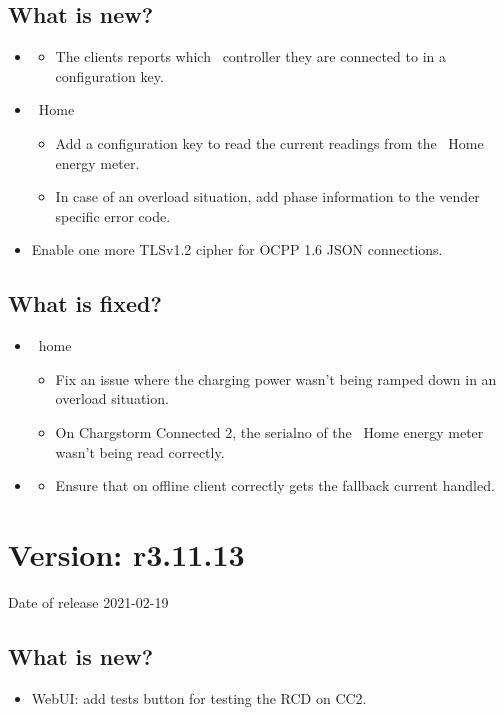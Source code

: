 \documentclass{scrartcl}
\begin{document}
\subsection*{What is new?}
\begin{itemize}
\item \nanogrid
  \begin{itemize}
  \item The clients reports which \nanogrid\ controller they are connected to
    in a configuration key.
  \end{itemize}
\item \nanogrid\ Home
  \begin{itemize}
  \item Add a configuration key to read the current readings from the
    \nanogrid\ Home energy meter.
  \item In case of an overload situation, add phase information to the vender
    specific error code.
  \end{itemize}
\item Enable one more TLSv1.2 cipher for OCPP 1.6 JSON connections.
\end{itemize}
\subsection*{What is fixed?}
\begin{itemize}
\item \nanogrid\ home
  \begin{itemize}
  \item Fix an issue where the charging power wasn't being ramped down in an
    overload situation.
  \item On Chargstorm Connected 2, the serialno of the \nanogrid\ Home energy
    meter wasn't being read correctly.
  \end{itemize}
\item \nanogrid
  \begin{itemize}
  \item Ensure that on offline client correctly gets the fallback current
    handled.
  \end{itemize}
\end{itemize}

\section{Version: r3.11.13}
Date of release 2021-02-19
\subsection*{What is new?}
\begin{itemize}
\item WebUI: add tests button for testing the RCD on CC2.
\end{itemize}
\end{document}
